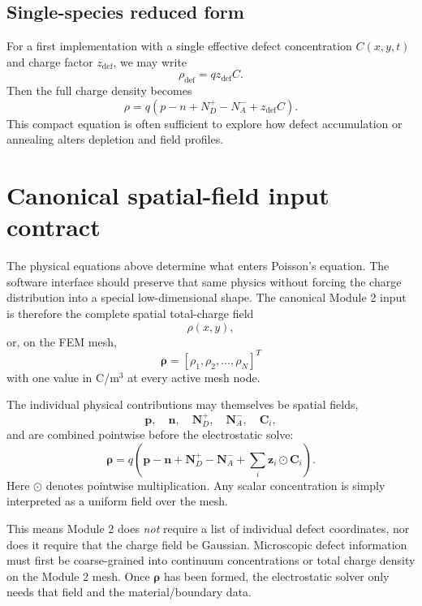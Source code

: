 \documentclass[11pt]{article}
\begin{document}
\subsection{Single-species reduced form}

For a first implementation with a single effective defect concentration $C(x,y,t)$ and charge factor $z_{\mathrm{def}}$, we may write
\begin{equation}
\rho_{\mathrm{def}} = q z_{\mathrm{def}} C.
\end{equation}
Then the full charge density becomes
\begin{equation}
\rho = q(p - n + N_D^+ - N_A^- + z_{\mathrm{def}}C).
\end{equation}
This compact equation is often sufficient to explore how defect accumulation or annealing alters depletion and field profiles.


\section{Canonical spatial-field input contract}

The physical equations above determine what enters Poisson's equation. The software interface should preserve that same physics without forcing the charge distribution into a special low-dimensional shape. The canonical Module 2 input is therefore the complete spatial total-charge field
\begin{equation}
\rho(x,y),
\end{equation}
or, on the FEM mesh,
\begin{equation}
\boxed{
\bm{\rho}=\left[\rho_1,\rho_2,\ldots,\rho_N\right]^T
}
\end{equation}
with one value in C/m$^3$ at every active mesh node.

The individual physical contributions may themselves be spatial fields,
\begin{equation}
\bm{p},\quad \bm{n},\quad \bm{N}_D^+,\quad \bm{N}_A^-,\quad \bm{C}_i,
\end{equation}
and are combined pointwise before the electrostatic solve:
\begin{equation}
\boxed{
\bm{\rho}
=q\left(
\bm{p}-\bm{n}+\bm{N}_D^+-\bm{N}_A^-+
\sum_i \bm{z}_i\odot\bm{C}_i
\right).
}
\label{eq:nodal_charge_contract}
\end{equation}
Here $\odot$ denotes pointwise multiplication. Any scalar concentration is simply interpreted as a uniform field over the mesh.

This means Module 2 does \emph{not} require a list of individual defect coordinates, nor does it require that the charge field be Gaussian. Microscopic defect information must first be coarse-grained into continuum concentrations or total charge density on the Module 2 mesh. Once $\bm{\rho}$ has been formed, the electrostatic solver only needs that field and the material/boundary data.
\end{document}
